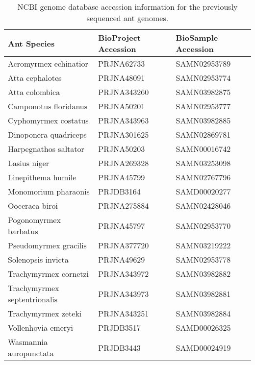 \begin{table}[ht]
\centering
\begin{tabular}{lll}
  \hline
Ant Species & BioProject Accession & BioSample Accession \\ 
  \hline
Acromyrmex echinatior & PRJNA62733 & SAMN02953789 \\ 
  Atta cephalotes & PRJNA48091 & SAMN02953774 \\ 
  Atta colombica & PRJNA343260 & SAMN03982875 \\ 
  Camponotus floridanus & PRJNA50201 & SAMN02953777 \\ 
  Cyphomyrmex costatus & PRJNA343963 & SAMN03982885 \\ 
  Dinoponera quadriceps & PRJNA301625 & SAMN02869781 \\ 
  Harpegnathos saltator & PRJNA50203 & SAMN00016742 \\ 
  Lasius niger & PRJNA269328 & SAMN03253098 \\ 
  Linepithema humile & PRJNA45799 & SAMN02767796 \\ 
  Monomorium pharaonis & PRJDB3164 & SAMD00020277 \\ 
  Ooceraea biroi & PRJNA275884 & SAMN02428046 \\ 
  Pogonomyrmex barbatus & PRJNA45797 & SAMN02953770 \\ 
  Pseudomyrmex gracilis & PRJNA377720 & SAMN03219222 \\ 
  Solenopsis invicta & PRJNA49629 & SAMN02953778 \\ 
  Trachymyrmex cornetzi & PRJNA343972 & SAMN03982882 \\ 
  Trachymyrmex septentrionalis & PRJNA343973 & SAMN03982881 \\ 
  Trachymyrmex zeteki & PRJNA343251 & SAMN03982884 \\ 
  Vollenhovia emeryi & PRJDB3517 & SAMD00026325 \\ 
  Wasmannia auropunctata & PRJDB3443 & SAMD00024919 \\ 
   \hline
\end{tabular}
\caption{NCBI genome database accession information for the previously sequenced ant genomes.} 
\end{table}

